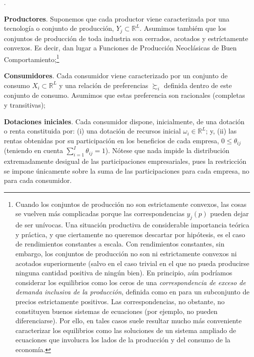 \documentclass[10pt,a4paper]{article}
\newcounter{numitem}
\newenvironment{lnum}
      {\begin{list}{\arabic{numitem}.}{%
          \usecounter{numitem}%
          \setlength{\leftmargin}{1cm}%
          \setlength{\parskip}{3pt}%
          \setlength{\itemsep}{0pt}%
          \setlength{\parsep}{0pt}%
      }}
      {\end{list}}
\begin{document}
\begin{lnum}
    \item \textbf{Productores}. Suponemos que cada productor viene caracterizada por una tecnología o conjunto de producción, $Y_j\subset\mathbb R^L$. Asumimos tambiém que los conjuntos de producción de toda industria son cerrados, acotados y estríctamente convexos. Es decir, dan lugar a Funciones de Producción Neoclásicas de Buen Comportamiento;\footnote{%
        Cuando los conjuntos de producción no son estrictamente convexos, las cosas se vuelven más complicadas porque las correspondencias $y_j(p)$ pueden dejar de ser unívocas. Una situación productiva de considerable importancia teórica y práctica, y que ciertamente no queremos descartar por hipótesis, es el caso de rendimientos constantes a escala. Con rendimientos constantes, sin embargo, los conjuntos de producción no son ni estrictamente convexos ni acotados superiormente (salvo en el caso trivial en el que no pueda producirse ninguna cantidad positiva de ningún bien). En principio, aún podríamos considerar los equilibrios como los ceros de una \textit{correspondencia de exceso de demanda inclusiva de la producción}, definida como en para un subconjunto de precios estrictamente positivos. Las correspondencias, no obstante, no constituyen buenos sistemas de ecuaciones (por ejemplo, no pueden diferenciarse). Por ello, en tales casos suele resultar mucho más conveniente caracterizar los equilibrios como las soluciones de un sistema ampliado de ecuaciones que involucra los lados de la producción y del consumo de la economía.
    }
    \item \textbf{Consumidores}. Cada consumidor viene caracterizado por un conjunto de consumo $X_i\subset\mathbb R^L$ y una relación de preferencias $\succsim_i$ definida dentro de este conjunto de consumo. Asumimos que estas preferencia son racionales (completas y transitivas);
    \item \textbf{Dotaciones iniciales}. Cada consumidor dispone, inicialmente, de una dotación o renta constituida por: (i) una dotación de recursos inicial $\omega_i\in \mathbb R^L$; y, (ii) las rentas obtenidas por su participación en los beneficios de cada empresa, $0\leq\theta_{ij}$ (teniendo en cuenta $\sum_{i=1}^I\theta_{ij}=1$). Nótese que nada impide la distribución extremadamente desigual de las participaciones empresariales, pues la restricción se impone únicamente sobre la suma de las participaciones para cada empresa, no para cada consumidor. 
\end{lnum}
\end{document}
